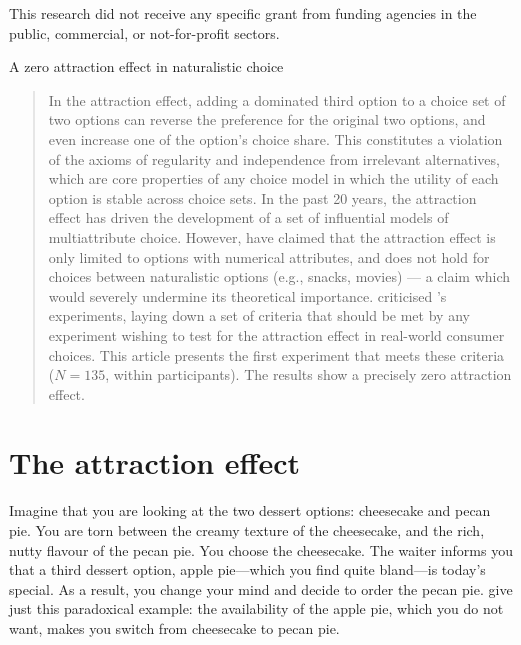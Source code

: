 \documentclass[12pt, a4paper]{article}
\begin{document}
\begin{titlepage}
\thispagestyle{empty}
\maketitle
\centering
    This research did not receive any specific grant from funding agencies in the public, commercial, or not-for-profit sectors.
\clearpage
\thispagestyle{empty}
\RaggedRight
\begin{center}
\LARGE{A zero attraction effect in naturalistic choice}
\end{center}
\begin{abstract}
\noindent
		In the attraction effect, adding a dominated third option to a choice set of two options can reverse the preference for the original two options, and even increase one of the option's choice share. This constitutes a violation of the axioms of regularity and independence from irrelevant alternatives, which are core properties of any choice model in which the utility of each option is stable across choice sets. In the past 20 years, the attraction effect has driven the development of a set of influential models of multiattribute choice. However,  have claimed that the attraction effect is only limited to options with numerical attributes, and does not hold for choices between naturalistic options (e.g., snacks, movies) --- a claim which would severely undermine its theoretical importance.  criticised \citeauthor{Frederick2014}'s experiments, laying down a set of criteria that should be met by any experiment wishing to test for the attraction effect in real-world consumer choices. This article presents the first experiment that meets these criteria ($N=135$, within participants). The results show a precisely zero attraction effect.
\end{abstract}


\end{titlepage}



\newpage
\RaggedRight

\section*{The attraction effect}


Imagine that you are looking at the two dessert options: cheesecake and pecan pie. You are torn between the creamy texture of the cheesecake, and the rich, nutty flavour of the pecan pie. You choose the cheesecake. The waiter informs you that a third dessert option, apple pie---which you find quite bland---is today's special. As a result, you change your mind and decide to order the pecan pie.  give just this paradoxical example: the availability of the apple pie, which you do not want, makes you switch from cheesecake to pecan pie.
\end{document}
